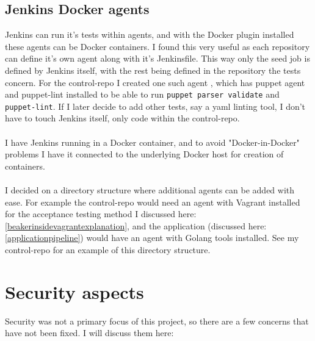 \subsection{Jenkins Docker agents}

Jenkins can run it's tests within agents, and with the Docker plugin installed these agents can be Docker containers. I found this very useful as each repository can define it's own agent along with it's Jenkinsfile. This way only the seed job is defined by Jenkins itself, with the rest being defined in the repository the tests concern. For the control-repo I created one such agent \cite{imt3005projectcicd}, which has puppet agent and puppet-lint installed to be able to run \texttt{puppet parser validate} and \texttt{puppet-lint}. If I later decide to add other tests, say a yaml linting tool, I don't have to touch Jenkins itself, only code within the control-repo.
\\
\\
I have Jenkins running in a Docker container, and to avoid "Docker-in-Docker" problems I have it connected to the underlying Docker host for creation of containers. \cite{dockerindockerarticle}
\\
\\
I decided on a directory structure where additional agents can be added with ease. For example the control-repo would need an agent with Vagrant installed for the acceptance testing method I discussed here: \ref{beakerinsidevagrantexplanation}, and the application (discussed here: \ref{applicationpipeline}) would have an agent with Golang tools installed. See my control-repo \cite{imt3005projectcicd} for an example of this directory structure.







\section{Security aspects}

Security was not a primary focus of this project, so there are a few concerns that have not been fixed. I will discuss them here:

